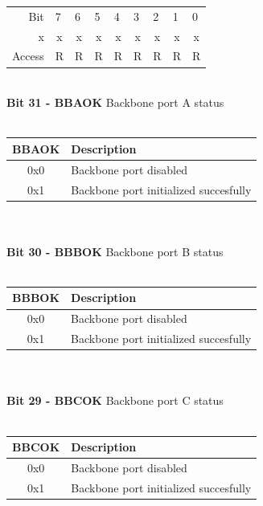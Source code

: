 \documentclass{article}
\begin{document}
\begin{table}[h!]
\begin{tabular}{rp{1.25cm}p{1.25cm}p{1.25cm}p{1.25cm}p{1.25cm}p{1.25cm}p{1.25cm}p{1.25cm}}
Bit &
  7 &
  6 &
  5 &
  4 &
  3 &
  2 &
  1 &
  0 \\ \cline{2-9} 

\multicolumn{1}{r|}{x} &
  \multicolumn{1}{c|}{x} &
  \multicolumn{1}{c|}{x} & 
  \multicolumn{1}{c|}{x} &
  \multicolumn{1}{c|}{x} & 
  \multicolumn{1}{c|}{x} & 
  \multicolumn{1}{c|}{x} &
  \multicolumn{1}{c|}{x} &
  \multicolumn{1}{c|}{x} \\\cline{2-9} 
  
Access &
  R &
  R &
  R &
  R &
  R &
  R &
  R &
  R
\end{tabular}
\end{table}\\
\textbf{Bit 31 - BBAOK} Backbone port A status\\\\
\begin{tabular}{|c|l|}
    \hline
   BBAOK & Description\\ \hline
   0x0 & Backbone port disabled\\ \hline
   0x1 & Backbone port initialized succesfully \\ \hline
\end{tabular}\\\\
\textbf{Bit 30 - BBBOK} Backbone port B status\\\\
\begin{tabular}{|c|l|}
    \hline
   BBBOK & Description\\ \hline
   0x0 & Backbone port disabled\\ \hline
   0x1 & Backbone port initialized succesfully \\ \hline
\end{tabular}\\\\
\textbf{Bit 29 - BBCOK} Backbone port C status\\\\
\begin{tabular}{|c|l|}
    \hline
   BBCOK & Description\\ \hline
   0x0 & Backbone port disabled\\ \hline
   0x1 & Backbone port initialized succesfully \\ \hline
\end{tabular}\\\\
\end{document}
